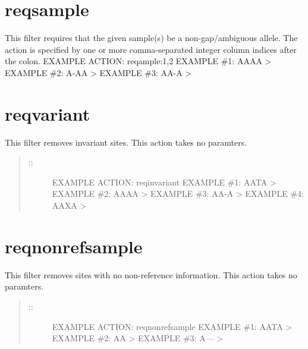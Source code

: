 \documentclass[letterpaper,11pt,english]{sphinxmanual}
\begin{document}
\section{reqsample}
\label{\detokenize{mvf_filter_modules:reqsample}}
This filter requires that the given sample(s) be a non-gap/ambiguous
allele. The action is specified by one or more
comma-separated integer column indices after the colon.
EXAMPLE ACTION: reqample:1,2
EXAMPLE \#1: AAAA \textendash{}\textgreater{} 
EXAMPLE \#2: A-AA \textendash{}\textgreater{} 
EXAMPLE \#3: AA-A \textendash{}\textgreater{} 


\section{reqvariant}
\label{\detokenize{mvf_filter_modules:reqvariant}}
This filter removes invariant sites.
This action takes no paramters.
\begin{quote}
\begin{description}
\item[{::}] \leavevmode
EXAMPLE ACTION: reqinvariant
EXAMPLE \#1: AATA \textendash{}\textgreater{} 
EXAMPLE \#2: AAAA \textendash{}\textgreater{} 
EXAMPLE \#3: AA-A \textendash{}\textgreater{} 
EXAMPLE \#4: AAXA \textendash{}\textgreater{} 

\end{description}
\end{quote}


\section{reqnonrefsample}
\label{\detokenize{mvf_filter_modules:reqnonrefsample}}
This filter removes sites with no non-reference information.
This action takes no paramters.
\begin{quote}
\begin{description}
\item[{::}] \leavevmode
EXAMPLE ACTION: reqnonrefsample
EXAMPLE \#1: AATA \textendash{}\textgreater{} 
EXAMPLE \#2: A\textendash{}A \textendash{}\textgreater{} 
EXAMPLE \#3: A— \textendash{}\textgreater{} 

\end{description}
\end{quote}
\end{document}

